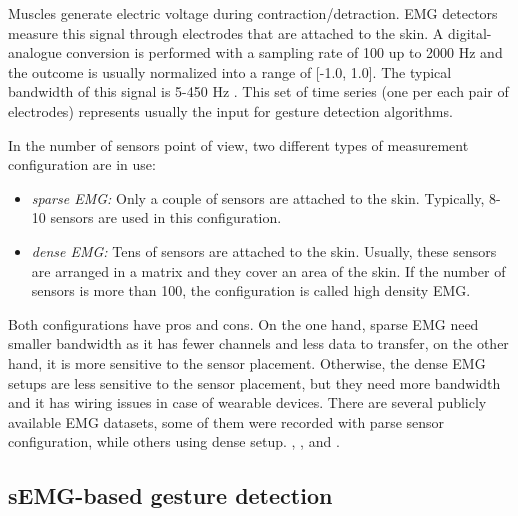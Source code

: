 \documentclass[conference]{IEEEtran}
\begin{document}
Muscles generate electric voltage during contraction/detraction. EMG detectors measure this signal through electrodes that are attached to the skin. A digital-analogue conversion is performed with a sampling rate of 100 up to 2000 Hz and the outcome is usually normalized into a range of [-1.0, 1.0]. The typical bandwidth of this signal is 5-450 Hz \cite{emgbw}. This set of time series (one per each pair of electrodes) represents usually the input for gesture detection algorithms.

In the number of sensors point of view, two different types of measurement configuration are in use:
\begin{itemize}
	\item \textit{sparse EMG:} Only a couple of sensors are attached to the skin. Typically, 8- 10 sensors are used in this configuration. 
	\item \textit{dense EMG:} Tens of sensors are attached to the skin. Usually, these sensors are arranged in a matrix and they cover an area of the skin. If the number of sensors is more than 100, the configuration is called high density EMG.
\end{itemize}
Both configurations have pros and cons. On the one hand, sparse EMG need smaller bandwidth as it has fewer channels and less data to transfer, on the other hand, it is more sensitive to the sensor placement. Otherwise, the dense EMG setups are less sensitive to the sensor placement, but they need more bandwidth and it has wiring issues in case of wearable devices. There are several publicly available EMG datasets, some of them were recorded with parse sensor configuration, while others using dense setup. \cite{b6}, \cite{b7}, \cite{b8} and \cite{b12}.


\subsection{sEMG-based gesture detection}
\end{document}
